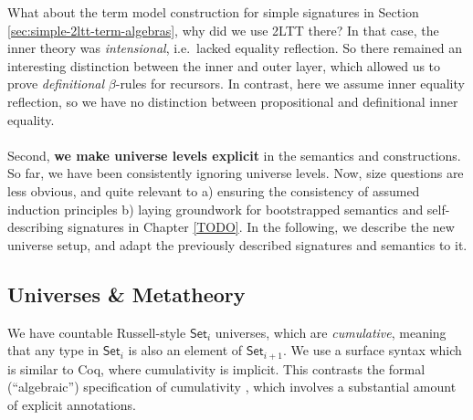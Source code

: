 \documentclass[12pt,a4paper,twoside,openany]{book}
\theoremstyle{remark}
\theoremstyle{definition}
\theoremstyle{theorem}
\newcommand{\Set}{\mathsf{Set}}
\begin{document}
What about the term model construction for simple signatures in Section
\ref{sec:simple-2ltt-term-algebras}, why did we use 2LTT there? In that case,
the inner theory was \emph{intensional}, i.e.\ lacked equality reflection. So
there remained an interesting distinction between the inner and outer layer,
which allowed us to prove \emph{definitional} $\beta$-rules for recursors. In
contrast, here we assume inner equality reflection, so we have no distinction
between propositional and definitional inner equality.
\\\\
\indent Second, \textbf{we make universe levels explicit} in the semantics and
constructions. So far, we have been consistently ignoring universe levels. Now,
size questions are less obvious, and quite relevant to a) ensuring the
consistency of assumed induction principles b) laying groundwork for
bootstrapped semantics and self-describing signatures in Chapter \ref{TODO}. In
the following, we describe the new universe setup, and adapt the previously
described signatures and semantics to it.

\subsection{Universes \& Metatheory}
\label{sec:cumulative-ett}

We have countable Russell-style $\Set_i$ universes, which are \emph{cumulative},
meaning that any type in $\Set_i$ is also an element of $\Set_{i+1}$. We use a
surface syntax which is similar to Coq, where cumulativity is implicit. This
contrasts the formal (``algebraic'') specification of cumulativity
\cite{sterling2019algebraic,kovacs2021generalized}, which involves a substantial
amount of explicit annotations.
\end{document}
